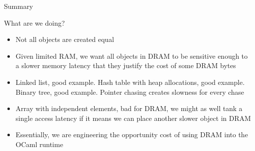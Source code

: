 \begin{frame}{Summary}
  \begin{block}{What are we doing?}
    \begin{itemize}[<+>]
      \item Not all objects are created equal
      \item Given limited RAM, we want all objects in DRAM to be sensitive enough to a slower memory latency that they justify the cost of some DRAM bytes
      \item Linked list, good example. Hash table with heap allocations, good example. Binary tree, good example. Pointer chasing creates slowness for every chase
      \item Array with independent elements, bad for DRAM, we might as well tank a single access latency if it means we can place another slower object in DRAM
      \item Essentially, we are engineering the opportunity cost of using DRAM into the OCaml runtime
    \end{itemize}
  \end{block}
\end{frame}
